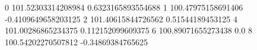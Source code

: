 0 101.52303314208984 0.6323165893554688
1 100.47975158691406 -0.4109649658203125
2 101.40615844726562 0.51544189453125
4 101.00286865234375 0.112152099609375
6 100.89071655273438 0.0
8 100.54202270507812 -0.34869384765625
